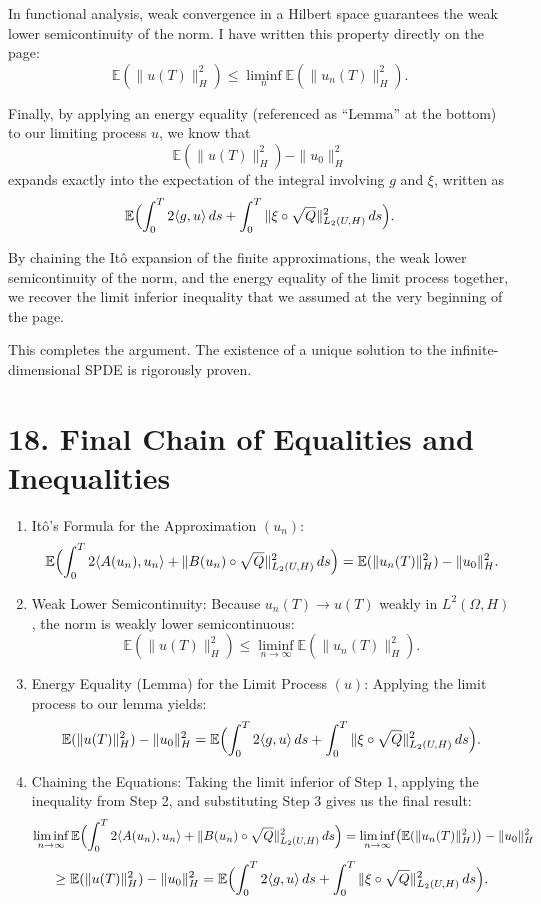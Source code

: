 \documentclass[11pt]{article}
\theoremstyle{definition}
\theoremstyle{remark}
\begin{document}
In functional analysis, weak convergence in a Hilbert space guarantees the weak lower semicontinuity of the norm. I have written this property directly on the page:
\[
  \mathbb{E}(\|u(T)\|_H^2) \le \liminf_n \mathbb{E}(\|u_n(T)\|_H^2).
\]

Finally, by applying an energy equality (referenced as ``Lemma'' at the bottom) to our limiting process $u$, we know that
\[
  \mathbb{E}(\|u(T)\|_H^2) - \|u_0\|_H^2
\]
expands exactly into the expectation of the integral involving $g$ and $\xi$, written as
\[
  \mathbb{E}\Bigl(\int_0^T 2\langle g, u \rangle\,ds + \int_0^T \|\xi\circ \sqrt{Q}\|_{L_2(U,H)}^2\,ds\Bigr).
\]

By chaining the It\^o expansion of the finite approximations, the weak lower semicontinuity of the norm, and the energy equality of the limit process together, we recover the limit inferior inequality that we assumed at the very beginning of the page.

This completes the argument. The existence of a unique solution to the infinite-dimensional SPDE is rigorously proven.


\section*{18. Final Chain of Equalities and Inequalities}
\begin{enumerate}
\item It\^o's Formula for the Approximation $(u_n)$:
\[
\mathbb{E}\Bigl(\int_0^T 2\langle A(u_n), u_n \rangle + \|B(u_n)\circ \sqrt{Q}\|_{L_2(U,H)}^2\,ds\Bigr)
= \mathbb{E}(\|u_n(T)\|_H^2) - \|u_0\|_H^2.
\]

\item Weak Lower Semicontinuity: Because $u_n(T) \to u(T)$ weakly in $L^2(\Omega,H)$, the norm is weakly lower semicontinuous:
\[
\mathbb{E}(\|u(T)\|_H^2) \le \liminf_{n\to\infty} \mathbb{E}(\|u_n(T)\|_H^2).
\]

\item Energy Equality (Lemma) for the Limit Process $(u)$: Applying the limit process to our lemma yields:
\[
\mathbb{E}(\|u(T)\|_H^2) - \|u_0\|_H^2
= \mathbb{E}\Bigl(\int_0^T 2\langle g, u \rangle\,ds + \int_0^T \|\xi\circ \sqrt{Q}\|_{L_2(U,H)}^2\,ds\Bigr).
\]

\item Chaining the Equations: Taking the limit inferior of Step 1, applying the inequality from Step 2, and substituting Step 3 gives us the final result:
\[
\liminf_{n\to\infty} \mathbb{E}\Bigl(\int_0^T 2\langle A(u_n), u_n \rangle + \|B(u_n)\circ \sqrt{Q}\|_{L_2(U,H)}^2\,ds\Bigr)
= \liminf_{n\to\infty}\bigl(\mathbb{E}(\|u_n(T)\|_H^2)\bigr) - \|u_0\|_H^2
\]
\[
\ge \mathbb{E}(\|u(T)\|_H^2) - \|u_0\|_H^2
= \mathbb{E}\Bigl(\int_0^T 2\langle g, u \rangle\,ds + \int_0^T \|\xi\circ \sqrt{Q}\|_{L_2(U,H)}^2\,ds\Bigr).
\]
\end{enumerate}
\end{document}
